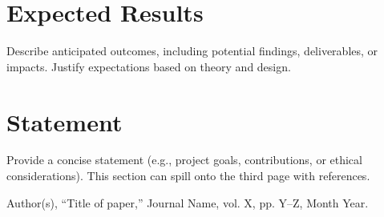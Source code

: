 \documentclass[conference,a4paper]{IEEEtran}
\begin{document}
\section{Expected Results}
Describe anticipated outcomes, including potential findings, deliverables, or impacts. Justify expectations based on theory and design.

\section{Statement}
Provide a concise statement (e.g., project goals, contributions, or ethical considerations). This section can spill onto the third page with references.

\begin{thebibliography}{00}
 Author(s), ``Title of paper,'' Journal Name, vol. X, pp. Y–Z, Month Year.
\end{thebibliography}
\end{document}
